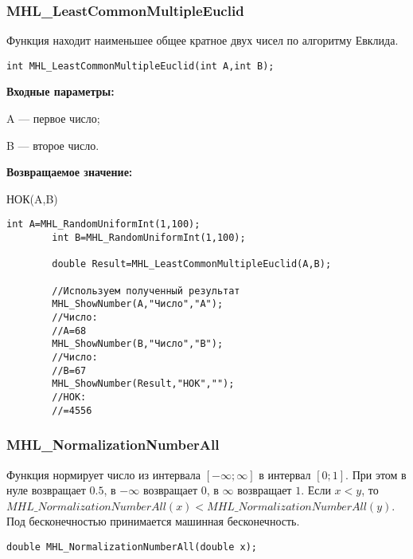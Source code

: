 \documentclass[a4paper,12pt]{article}
\begin{document}
\subsubsection{MHL\_LeastCommonMultipleEuclid}\label{MHL_LeastCommonMultipleEuclid}

Функция находит наименьшее общее кратное двух чисел по алгоритму Евклида.


\begin{lstlisting}[label=code_syntax_MHL_LeastCommonMultipleEuclid,caption=Синтаксис]
int MHL_LeastCommonMultipleEuclid(int A,int B);
\end{lstlisting}

\textbf{Входные параметры:}  
 
A --- первое число;
 
B --- второе число.

\textbf{Возвращаемое значение:}
 
 НОК(A,B)


\begin{lstlisting}[label=code_use_MHL_LeastCommonMultipleEuclid,caption=Пример использования]
        int A=MHL_RandomUniformInt(1,100);
        int B=MHL_RandomUniformInt(1,100);

        double Result=MHL_LeastCommonMultipleEuclid(A,B);

        //Используем полученный результат
        MHL_ShowNumber(A,"Число","A");
        //Число:
        //A=68
        MHL_ShowNumber(B,"Число","B");
        //Число:
        //B=67
        MHL_ShowNumber(Result,"НОК","");
        //НОК:
        //=4556
\end{lstlisting}

\subsubsection{MHL\_NormalizationNumberAll}\label{MHL_NormalizationNumberAll}

Функция нормирует число из интервала $\left[-\infty;\infty \right] $ в интервал $\left[0;1\right]$. При этом в нуле возвращает $0.5$, в $-\infty$ возвращает $0$, в $\infty$ возвращает $1$. Если $x<y$, то $MHL\_NormalizationNumberAll(x)<MHL\_NormalizationNumberAll(y)$. Под бесконечностью принимается машинная бесконечность.


\begin{lstlisting}[label=code_syntax_MHL_NormalizationNumberAll,caption=Синтаксис]
double MHL_NormalizationNumberAll(double x);
\end{lstlisting}
\end{document}

